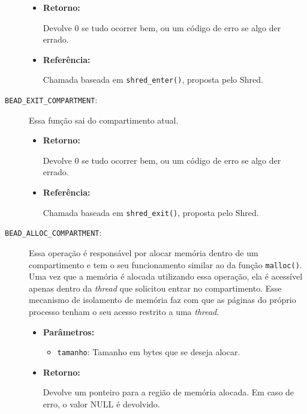 \begin{description}
  \begin{itemize}
    \item \textbf{Retorno:}

Devolve 0 se tudo ocorrer bem, ou um código de erro se algo der errado.

    \item \textbf{Referência:}

Chamada baseada em \texttt{shred\_enter()}, proposta pelo Shred.

\end{itemize}

  \item [\texttt{BEAD\_EXIT\_COMPARTMENT}:]

Essa função sai do compartimento atual.

  \begin{itemize}

    \item \textbf{Retorno:}

Devolve 0 se tudo ocorrer bem, ou um código de erro se algo der errado.

    \item \textbf{Referência:}

Chamada baseada em \texttt{shred\_exit()}, proposta pelo Shred.

  \end{itemize}

  \item [\texttt{BEAD\_ALLOC\_COMPARTMENT}:]

Essa operação é responsável por alocar memória dentro de um compartimento e tem
o seu funcionamento similar ao da função \texttt{malloc()}. Uma vez que a
memória é alocada utilizando essa operação, ela é acessível
apenas dentro da \emph{thread} que solicitou entrar no compartimento. Esse mecanismo
de isolamento de memória faz com que as páginas do próprio processo tenham o
seu acesso restrito a uma \emph{thread}.

  \begin{itemize}
    \item \textbf{Parâmetros:}

    \begin{itemize}
      \item \texttt{tamanho}: Tamanho em bytes que se deseja alocar.
    \end{itemize}

    \item \textbf{Retorno:}

Devolve um ponteiro para a região de memória alocada. Em caso de erro, o valor
NULL é devolvido.


\end{itemize}
\end{description}
